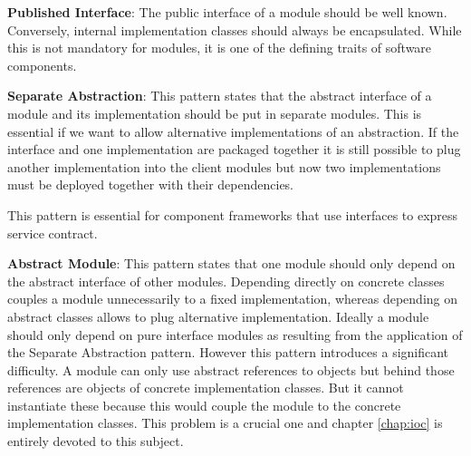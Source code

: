 \textbf{Published Interface}:
The public interface of a module should be well known. Conversely, internal implementation classes
should always be encapsulated. While this is not mandatory for modules, it is one of the defining
traits of software components.

\textbf{Separate Abstraction}:
This pattern states that the abstract interface of a module and its implementation should be put in separate modules.
This is essential if we want to allow alternative implementations of an abstraction. If the interface and one implementation
are packaged together it is still possible to plug another implementation into the client modules but now two implementations
must be deployed together with their dependencies.

This pattern is essential for component frameworks that use interfaces to express service contract.

\textbf{Abstract Module}:
This pattern states that one module should only depend on the abstract interface of other modules. Depending directly on
concrete classes couples a module unnecessarily to a fixed implementation, whereas depending on abstract classes allows
to plug alternative implementation. Ideally a module should only depend on pure interface modules as resulting from the
application of the Separate Abstraction pattern. However this pattern introduces a significant difficulty. A module
can only use abstract references to objects but behind those references are objects of concrete implementation classes.
But it cannot instantiate these because this would couple the module to the concrete implementation classes. This problem
is a crucial one and chapter \ref{chap:ioc} is entirely devoted to this subject.
